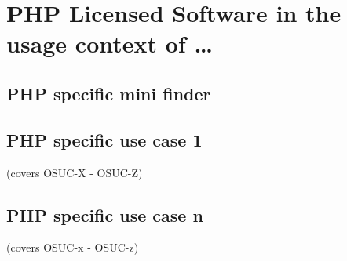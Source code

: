 %
%
%
%
%



\section{PHP Licensed Software in the usage context of \ldots}
\label{OSUC-01-PHP} \label{OSUC-03-PHP} 
\label{OSUC-06-PHP} \label{OSUC-09-PHP}

\label{OSUC-02-PHP} \label{OSUC-04-PHP} \label{OSUC-05-PHP}
\label{OSUC-07-PHP} \label{OSUC-08-PHP} \label{OSUC-10-PHP}

\subsection{PHP specific mini finder}

\subsection{PHP specific use case 1}
(covers OSUC-X - OSUC-Z)

\subsection{PHP specific use case n}
(covers OSUC-x - OSUC-z)


%

